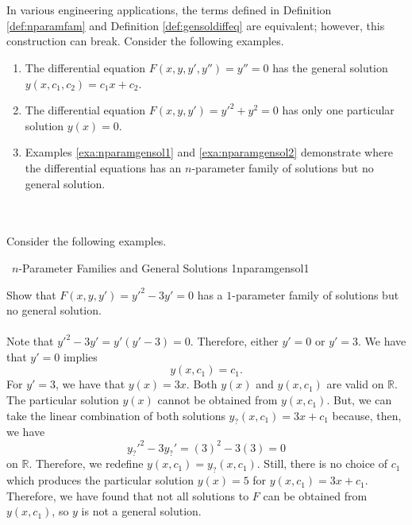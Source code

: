         \vphantom
        \\
        \\
        In various engineering applications, the terms defined in Definition \ref{def:nparamfam} and Definition \ref{def:gensoldiffeq} are equivalent; however, this construction can break. Consider the following examples.
       \begin{enumerate}
            \item The differential equation \(F(x,y,y',y'')=y''=0\) has the general solution \(y(x,c_1,c_2)=c_1x+c_2\).
            \item The differential equation \(F(x,y,y')=y'^2+y^2=0\) has only one particular solution \(y(x)=0\).
            \item Examples \ref{exa:nparamgensol1} and \ref{exa:nparamgensol2} demonstrate where the differential equations has an \(n\)-parameter family of solutions but no general solution.
       \end{enumerate}
       \pagebreak
       \vphantom
       \\
       \\
       Consider the following examples.
       \begin{example}{\Difficulty\,\Difficulty\,\,\(n\)-Parameter Families and General Solutions 1}{nparamgensol1}

            Show that \(F(x,y,y')=y'^2-3y'=0\) has a \(1\)-parameter family of solutions but no general solution.
            \\
            \\
            Note that \(y'^2-3y'=y'(y'-3)=0\). Therefore, either \(y'=0\) or \(y'=3\). We have that \(y'=0\) implies
            \begin{equation*}
                y(x,c_1)=c_1.
            \end{equation*}
            For \(y'=3\), we have that \(y(x)=3x\). Both \(y(x)\) and \(y(x,c_1)\) are valid on \(\mathbb{R}\). The particular solution \(y(x)\) cannot be obtained from \(y(x,c_1)\). But, we can take the linear combination of both solutions \(y_?(x,c_1)=3x+c_1\) because, then, we have
            \begin{equation*}
                y_?'^2-3y_?'=(3)^2-3(3)=0
            \end{equation*}
            on \(\mathbb{R}\). Therefore, we redefine \(y(x,c_1)=y_?(x,c_1)\). Still, there is no choice of \(c_1\) which produces the particular solution \(y(x)=5\) for \(y(x,c_1)=3x+c_1\). Therefore, we have found that not all solutions to \(F\) can be obtained from \(y(x,c_1)\), so \(y\) is not a general solution.

       \end{example}
